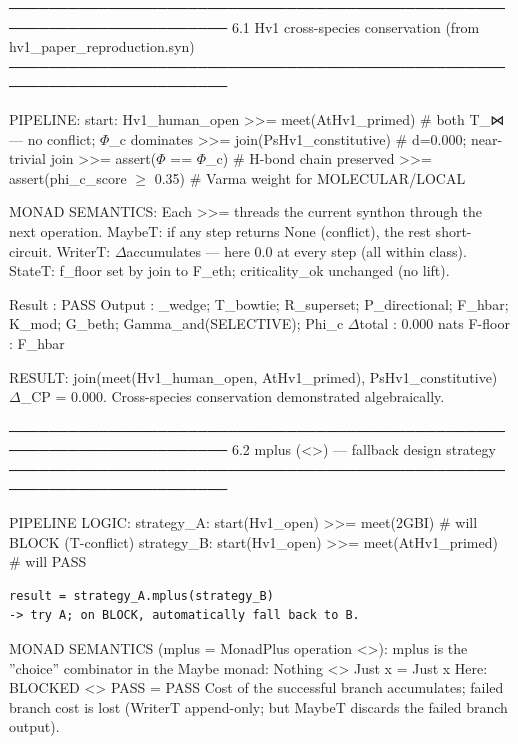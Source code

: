\documentclass[12pt,a4paper]{article}
\begin{document}
────────────────────────────────────────────────────────────────────────
6.1  Hv1 cross-species conservation (from hv1\_paper\_reproduction.syn)
────────────────────────────────────────────────────────────────────────

PIPELINE:
start: Hv1\_human\_open
\textgreater{}\textgreater{}= meet(AtHv1\_primed)          \# both T\_⋈ --- no conflict; $\Phi$\_c dominates
\textgreater{}\textgreater{}= join(PsHv1\_constitutive)    \# d=0.000; near-trivial join
\textgreater{}\textgreater{}= assert($\Phi$ == $\Phi$\_c)            \# H-bond chain preserved
\textgreater{}\textgreater{}= assert(phi\_c\_score $\geq$ 0.35)  \# Varma weight for MOLECULAR/LOCAL

MONAD SEMANTICS:
Each \textgreater{}\textgreater{}= threads the current synthon through the next operation.
MaybeT: if any step returns None (conflict), the rest short-circuit.
WriterT: $\Delta$\xi accumulates --- here 0.0 at every step (all within class).
StateT: f\_floor set by join to F\_eth; criticality\_ok unchanged (no lift).

Result   : PASS
Output   : \langleD\_wedge; T\_bowtie; R\_superset; P\_directional; F\_hbar; K\_mod; G\_beth; Gamma\_and(SELECTIVE); Phi\_c\rangle
$\Delta$\xi total : 0.000 nats
F-floor  : F\_hbar

RESULT: join(meet(Hv1\_human\_open, AtHv1\_primed), PsHv1\_constitutive)
$\Delta$\xi\_CP = 0.000. Cross-species conservation demonstrated algebraically.

────────────────────────────────────────────────────────────────────────
6.2  mplus (\textless{}\textbar{}\textgreater{}) --- fallback design strategy
────────────────────────────────────────────────────────────────────────

PIPELINE LOGIC:
strategy\_A: start(Hv1\_open) \textgreater{}\textgreater{}= meet(2GBI)    \# will BLOCK (T-conflict)
strategy\_B: start(Hv1\_open) \textgreater{}\textgreater{}= meet(AtHv1\_primed)  \# will PASS

\begin{lstlisting}
result = strategy_A.mplus(strategy_B)
-> try A; on BLOCK, automatically fall back to B.
\end{lstlisting}

MONAD SEMANTICS (mplus = MonadPlus operation \textless{}\textbar{}\textgreater{}):
mplus is the ''choice'' combinator in the Maybe monad:
Nothing \textless{}\textbar{}\textgreater{} Just x = Just x
Here: BLOCKED \textless{}\textbar{}\textgreater{} PASS = PASS
Cost of the successful branch accumulates; failed branch cost is lost
(WriterT append-only; but MaybeT discards the failed branch output).
\end{document}
